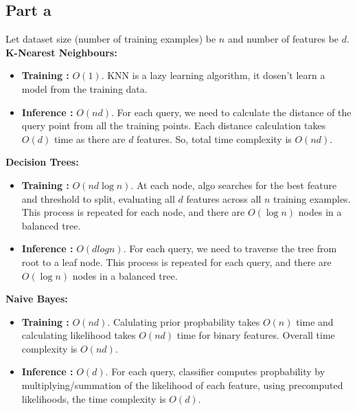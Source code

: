 \documentclass[12pt]{article}
\begin{document}
\subsection*{Part a}
Let dataset size (number of training examples) be $n$ and number of features be $d$. \\
\textbf{K-Nearest Neighbours:} 
\begin{itemize}
    \item \textbf{Training  :} $O(1)$. KNN is a lazy learning algorithm, it dosen't learn a model from the training data.
    \item \textbf{Inference :} $O(nd)$. For each query, we need to calculate the distance of the query point from all the training points.
                                Each distance calculation takes $O(d)$ time as there are $d$ features. So, total time complexity is $O(nd)$.
\end{itemize}  
\textbf{Decision Trees:}
\begin{itemize}
    \item \textbf{Training  :} $O(nd\log n)$. At each node, algo searches for the best feature and threshold to split, 
                                evaluating all $d$ features across all $n$ training examples.
                                This process is repeated for each node, and there are $O(\log n)$ nodes in a balanced tree.
    \item \textbf{Inference :} $O(dlog n)$. For each query, we need to traverse the tree from root to a leaf node.
                                This process is repeated for each query, and there are $O(\log n)$ nodes in a balanced tree.
\end{itemize}
\textbf{Naive Bayes:}
\begin{itemize}
    \item \textbf{Training  :} $O(nd)$. Calulating prior propbability takes $O(n)$ time and calculating likelihood takes $O(nd)$ time for binary features.
                                Overall time complexity is $O(nd)$.
    \item \textbf{Inference :} $O(d)$. For each query, classifier computes propbability by multiplying/summation of the likelihood of each feature,
                                using precomputed likelihoods, the time complexity is $O(d)$.
\end{itemize}
\end{document}

